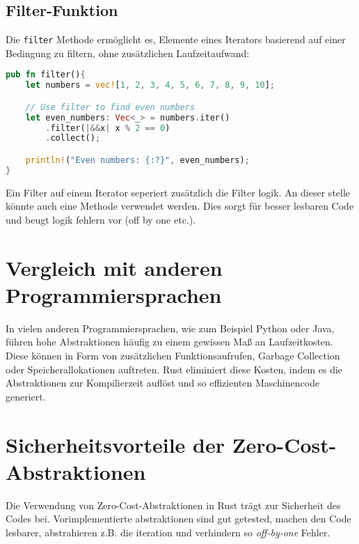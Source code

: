 \subsection{Filter-Funktion}

Die \texttt{filter} Methode ermöglicht es, Elemente eines Iterators basierend auf einer Bedingung zu filtern, ohne zusätzlichen Laufzeitaufwand:

\begin{lstlisting}[language=Rust, caption=Filter-Funktion]
pub fn filter(){
    let numbers = vec![1, 2, 3, 4, 5, 6, 7, 8, 9, 10];

    // Use filter to find even numbers
    let even_numbers: Vec<_> = numbers.iter()
        .filter(|&&x| x % 2 == 0)
        .collect();

    println!("Even numbers: {:?}", even_numbers);
}
\end{lstlisting}
Ein Filter auf einem Iterator seperiert zusätzlich die Filter logik.
An dieser stelle könnte auch eine Methode verwendet werden.
Dies sorgt für besser lesbaren Code und beugt logik fehlern vor (off by one etc.).
\section{Vergleich mit anderen Programmiersprachen}

In vielen anderen Programmiersprachen, wie zum Beispiel Python oder Java, führen hohe Abstraktionen häufig zu einem gewissen Maß an Laufzeitkosten. 
Diese können in Form von zusätzlichen Funktionsaufrufen, Garbage Collection oder Speicherallokationen auftreten. 
Rust eliminiert diese Kosten, indem es die Abstraktionen zur Kompilierzeit auflöst und so effizienten Maschinencode generiert.

\section{Sicherheitsvorteile der Zero-Cost-Abstraktionen}

Die Verwendung von Zero-Cost-Abstraktionen in Rust trägt zur Sicherheit des Codes bei.
Vorimplementierte abstraktionen sind gut getested, machen den Code lesbarer, abstrahieren z.B. die iteration und verhindern so \textit{{\gls{off-by-one}}} Fehler.

